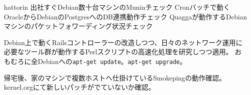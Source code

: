 \begin{prework}{hattorin}
出社すぐDebian数十台マシンのMuninチェック
Cronバッチで動くOracleからDebianのPostgresへのDB連携動作チェック
Quaggaが動作するDebianマシンのパケットフォワーディング状況チェック

Debian上で動くRailsコントローラーの改造しつつ、日々のネットワーク運用に必要なツール群が動作するPerlスクリプトの高速化処理を研究しつつ適用。
おもむろに全Debianへの\texttt{apt-get update}。\texttt{apt-get upgrade}。

帰宅後、家のマシンで複数ホストへ仕掛けているSmokepingの動作確認。
kernel.orgにて新しいパッチがでていないか確認。
\end{prework}
